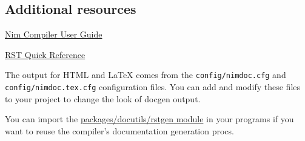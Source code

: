 \hypertarget{additional-resources}{%
\subsection{Additional resources}\label{additional-resources}}

\href{nimc.html\#compiler-usage-command-line-switches}{Nim Compiler User
Guide}

\href{http://docutils.sourceforge.net/docs/user/rst/quickref.html}{RST
Quick Reference}

The output for HTML and LaTeX comes from the \texttt{config/nimdoc.cfg}
and \texttt{config/nimdoc.tex.cfg} configuration files. You can add and
modify these files to your project to change the look of docgen output.

You can import the \href{rstgen.html}{packages/docutils/rstgen module}
in your programs if you want to reuse the compiler's documentation
generation procs.
